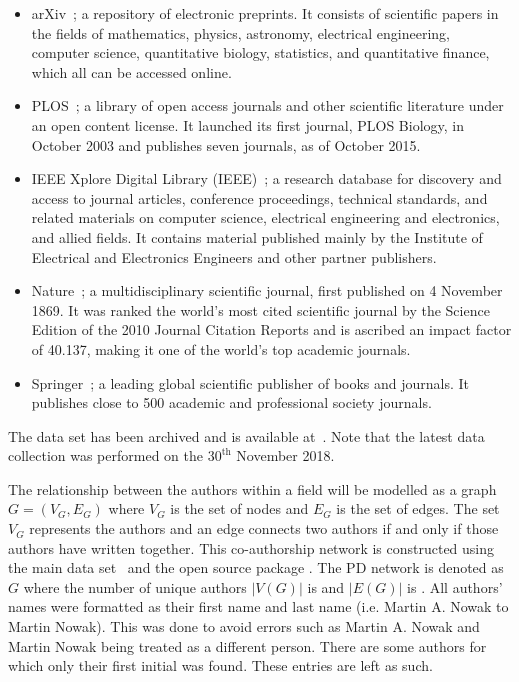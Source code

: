 \begin{multicols}{2}
    \begin{itemize}
        \item arXiv~\cite{mckiernan2000}; a repository of electronic preprints.
        It consists of scientific
        papers in the fields of mathematics, physics, astronomy, electrical engineering,
        computer science, quantitative biology, statistics, and quantitative finance,
        which all can be accessed online.
        \item PLOS~\cite{plos}; a library of open access journals and other scientific literature
        under an open content license. It launched its first journal, PLOS Biology,
        in October 2003 and publishes seven journals, as of October 2015.
        \item IEEE Xplore Digital Library (IEEE)~\cite{ieee}; a research database for discovery
        and access to journal articles, conference proceedings, technical standards,
        and related materials on computer science, electrical engineering and electronics,
        and allied fields. It contains material published mainly by the Institute of
        Electrical and Electronics Engineers and other partner publishers. 
        \item Nature~\cite{nature}; a multidisciplinary scientific journal,
        first published on 4 November 1869. It was ranked the world's most cited
        scientific journal by the Science Edition of the 2010 Journal Citation Reports
        and is ascribed an impact factor of 40.137, making it one of the world's
        top academic journals.
        \item Springer~\cite{springer}; a leading global scientific publisher of
        books and journals. It publishes close to 500 academic and professional
        society journals.
    \end{itemize}
\end{multicols}

The data set has been archived and is available at~\cite{pd_data_2018}. Note that the latest data
collection was performed on the \(30^{\text{th}}\) November 2018.

The relationship between the authors within a field will be modelled as a graph
\(G = (V_G, E_G)\) where \(V_G\) is the set of nodes and \(E_G\)  is the set of
edges. The set \(V_G\) represents the authors and an edge connects two authors
if and only if those authors have written together. This co-authorship network is
constructed using the main data set~\cite{pd_data_2018} and the open source package
\cite{networkx}. The PD network is denoted as \(G\) where the
number of unique authors \(|V(G)|\) is \authors and \(|E(G)|\) is \edges.
All authors' names were formatted as their first name and last name (i.e.
Martin A. Nowak to Martin Nowak). This was done to avoid errors such as Martin
A. Nowak and Martin Nowak being treated as a different person. There are some
authors for which only their first initial was found. These entries are left as
such.

